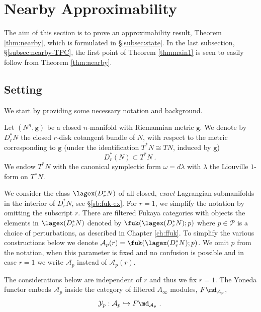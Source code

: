 
\section{Nearby Approximability}\label{sec:nearby}
 
 The aim of this section is to prove an approximability result, Theorem \ref{thm:nearby},  which is formulated in \S \ref{subsec:state}. In the last subsection, \S\ref{subsec:nearby-TPC},  the first point  of Theorem  \ref{thmmain1} is  seen to easily follow  from Theorem \ref{thm:nearby}. 

 \subsection{Setting}\label{subsec:back} We start by providing some necessary notation and background.
 
 Let $(N^{n},\mathtt{g})$ be a closed $n$-manifold with Riemannian metric $\mathtt{g}$. 
 We denote by $D_{r}^{\ast}N$ the closed $r$-disk cotangent bundle of $N$, with respect to  the  metric corresponding to $\mathtt{g}$ (under the identification $T^{\ast}N\cong TN$, induced by $\mathtt{g}$) $$D_{r}^{\ast}(N)\subset T^{\ast}N~.~$$
 We endow $T^{\ast}N$ with the canonical symplectic form
 $\omega=d\lambda$ with $\lambda$ the Liouville $1$-form on $T{^\ast}N$.
 
 We consider the class $\lagex(D^{\ast}_{r}N)$ of all closed, {\em exact} Lagrangian submanifolds in the interior of $D_{r}^{\ast}N$, see \S\ref{sb:fuk-ex}. For $r=1$, we simplify the notation by omitting the subscript $r$. There are filtered Fukaya categories with objects the elements in $\lagex(D^{\ast}_{r}N)$ denoted by $\fuk(\lagex(D^{\ast}_{r}N); p)$ where $p\in\mathcal{P}$ is a choice of perturbations, as described in Chapter \ref{ch:ffuk}.   To simplify the various constructions below we denote $\mathcal{A}_{p}(r)=\fuk(\lagex(D^{\ast}_{r}N); p)$. We  omit $p$ from the notation, when this parameter is fixed and no confusion is possible and in case $r=1$ we write $\mathcal{A}_{p}$ instead of $\mathcal{A}_{p}(r)$. 
 
The considerations below are independent of $r$ and thus we fix $r=1$.
 The Yoneda functor embeds $\mathcal{A}_{p}$ inside the category 
 of filtered $A_{\infty}$ modules, $
 F\md_{\mathcal{A}_{p}}$,
 $$\mathcal{Y}_{p}: \mathcal{A}_{p}\hookrightarrow F\md_{\mathcal{A}_{p}}~.~$$
 
